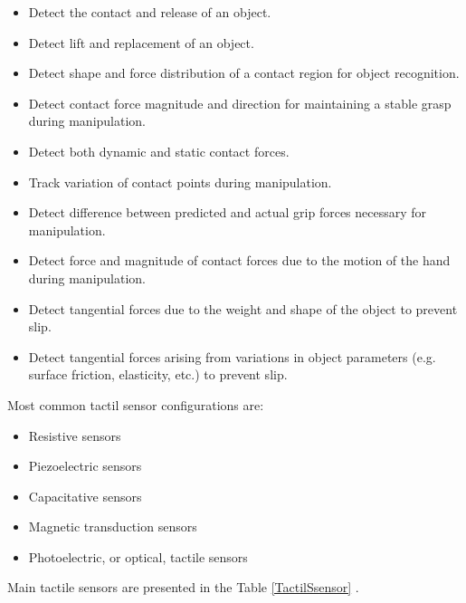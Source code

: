 \documentclass[a4paper, 10pt, conference]{ieeeconf}      %
\begin{document}
		\begin{itemize}
			\item Detect the contact and release of an object.
			\item Detect lift and replacement of an object.
			\item Detect shape and force distribution of a contact region for object recognition.
			\item Detect contact force magnitude and direction for maintaining a stable grasp during manipulation.
			\item Detect both dynamic and static contact forces.
			\item Track variation of contact points during manipulation.
			\item Detect difference between predicted and actual grip forces necessary for manipulation.
			\item Detect force and magnitude of contact forces due to the motion of the hand during manipulation.
			\item Detect tangential forces due to the weight and shape of the object to prevent slip.
			\item Detect tangential forces arising from variations in object parameters (e.g. surface friction, elasticity, etc.) to prevent slip.\\
		\end{itemize}
Most common tactil sensor configurations are:
		\begin{itemize}
			\item Resistive sensors
			\item Piezoelectric sensors
			\item Capacitative sensors
			\item Magnetic transduction sensors
			\item Photoelectric, or optical, tactile sensors\\
		\end{itemize}
Main tactile sensors are presented in the Table \ref{TactilSsensor} \cite{wettels2014multimodal}.\\
\end{document}
